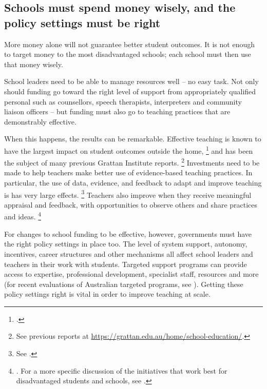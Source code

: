 \documentclass{grattan}
\begin{document}
\subsection{Schools must spend money wisely, and the policy settings must be right}\label{subsec:Schools-and-governments-must-spend-money-wisely}

More money alone will not guarantee better student outcomes.
It is not enough to target money to the most disadvantaged schools; each school must then use that money wisely.

School leaders need to be able to manage resources well -- no easy task.
Not only should funding go toward the right level of support from appropriately qualified personal such as counsellors, speech therapists, interpreters and community liaison officers -- but funding must also go to teaching practices that are demonstrably effective.

When this happens, the results can be remarkable.
Effective teaching is known to have the largest impact on student outcomes outside the home,%
\footcite{Hattie2008visiblelearningsynthesis}
and has been the subject of many previous Grattan Institute reports.%
\footnote{See previous reports at \textcolor{blue}{\url{https://grattan.edu.au/home/school-education/}}.}
Investments need to be made to help teachers make better use of evidence-based teaching practices.
In particular, the use of data, evidence, and feedback to adapt and improve teaching is has very large effects.%
\footnote{See \textcite{Goss2015TargetedTeachingHow}.}
Teachers also improve when they receive meaningful appraisal and feedback, with opportunities to observe others and share practices and ideas.%
\footnote{\textcite[][7]{Jensen2011BetterTeacherAppraisal}.
For a more specific discussion of the initiatives that work best for disadvantaged students and schools, see \textcite{OECD2012EquityQualityEducation}.}

For changes to school funding to be effective, however, governments must have the right policy settings in place too.
The level of system support, autonomy, incentives, career structures and other mechanisms all affect school leaders and teachers in their work with students. Targeted support programs can provide access to expertise, professional development, specialist staff, resources and more (for recent evaluations of Australian targeted programs, see ). Getting these policy settings right is vital in order to improve teaching at scale.
\end{document}
